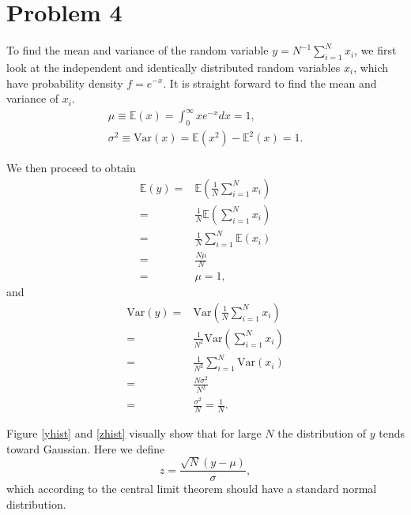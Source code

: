 \documentclass[11pt]{article}
\begin{document}
\section{Problem 4}
To find the mean and variance of the random variable $y = N^{-1}\sum_{i=1}^{N} x_i$, we first look at the independent and identically distributed random variables $x_i$, which have probability density $f = e^{-x}$. It is straight forward to find the mean and variance of $x_i$.
\begin{equation}
\begin{gathered}
    \mu \equiv \mathbb{E}(x) = \int_0^\infty x e^{-x} dx = 1, \\
    \sigma^2 \equiv \mathrm{Var}(x) = \mathbb{E}(x^2) - \mathbb{E}^2(x) = 1.
\end{gathered}
\end{equation}

We then proceed to obtain
\begin{equation}
\begin{split}
    \mathbb{E}(y) = & \mathbb{E}\left( \frac{1}{N}\sum_{i=1}^{N} x_i \right) \\
    = & \frac{1}{N} \mathbb{E}\left( \sum_{i=1}^{N} x_i \right) \\
    = & \frac{1}{N} \sum_{i=1}^{N} \mathbb{E}(x_i) \\
    = & \frac{N \mu}{N} \\
    = & \mu = 1,
\end{split}
\end{equation}
and
\begin{equation}
\begin{split}
    \mathrm{Var}(y) = & \mathrm{Var}\left( \frac{1}{N}\sum_{i=1}^{N} x_i \right) \\
    = & \frac{1}{N^2} \mathrm{Var}\left( \sum_{i=1}^{N} x_i \right) \\
    = & \frac{1}{N^2} \sum_{i=1}^{N} \mathrm{Var}(x_i) \\
    = & \frac{N \sigma^2}{N^2} \\
    = & \frac{\sigma^2}{N} = \frac{1}{N}.
\end{split}
\end{equation}

Figure \ref{yhist} and \ref{zhist} visually show that for large $N$ the distribution of $y$ tends toward Gaussian. Here we define
\begin{equation}
    z = \frac{\sqrt{N} (y-\mu)}{\sigma},
\end{equation}
which according to the central limit theorem should have a standard normal distribution.
\end{document}
